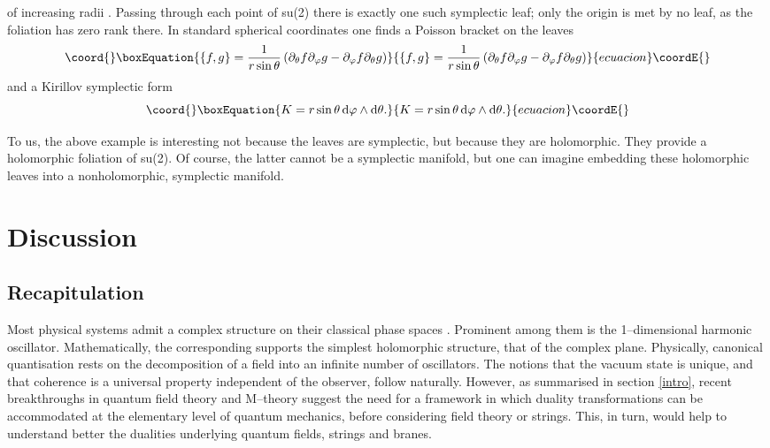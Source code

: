 \documentclass[a4paper,a4paper]{article}
\begin{document}
\coordHE{} of increasing radii \coordHE{}. Passing through each point of su(2) 
there is exactly one such symplectic leaf; only the origin is met by no leaf, 
as the foliation has  zero rank there. In standard spherical coordinates 
\coordHE{}  one 
finds a Poisson bracket on the leaves 
\begin{equation}\coord{}\boxEquation{
\left\{f,g\right\}={1\over r\sin\theta}\left(\partial_{\theta}f 
\partial_{\varphi}g - \partial_{\varphi}f \partial_{\theta}g\right)
\label{ssphc}
}{
\left\{f,g\right\}={1\over r\sin\theta}\left(\partial_{\theta}f 
\partial_{\varphi}g - \partial_{\varphi}f \partial_{\theta}g\right)
}{ecuacion}\coordE{}\end{equation}
and a Kirillov symplectic form 
\begin{equation}\coord{}\boxEquation{
K=r\sin \theta\, {\rm d} \varphi\wedge {\rm d} \theta.
\label{kiri}
}{
K=r\sin \theta\, {\rm d} \varphi\wedge {\rm d} \theta.
}{ecuacion}\coordE{}\end{equation}

To us, the above example is interesting not because the leaves are symplectic, 
but because they are holomorphic. They provide a holomorphic foliation of 
su(2). Of course, the latter cannot be a symplectic manifold, 
but one can imagine embedding these holomorphic leaves into a nonholomorphic, 
symplectic manifold.

\section{Discussion}\label{discussion}

\subsection{Recapitulation}\label{recap}

Most physical systems admit a complex structure \coordHE{} on their 
classical phase spaces \coordHE{}. Prominent among them is the 
1--dimensional harmonic oscillator. Mathematically, the corresponding 
\coordHE{} supports the simplest holomorphic structure, that of the complex plane.
Physically, canonical quantisation rests on the decomposition 
of a field into an infinite number of oscillators. The notions that the vacuum state 
is unique, and that coherence is a universal property independent of the 
observer, follow naturally. However, as summarised in section \ref{intro}, 
recent breakthroughs in quantum field theory and M--theory suggest the need 
for a framework in which duality transformations can be accommodated at the elementary 
level of quantum mechanics, before considering field theory or strings. 
This, in turn, would help to understand better the dualities underlying 
quantum fields, strings and branes.
\end{document}
